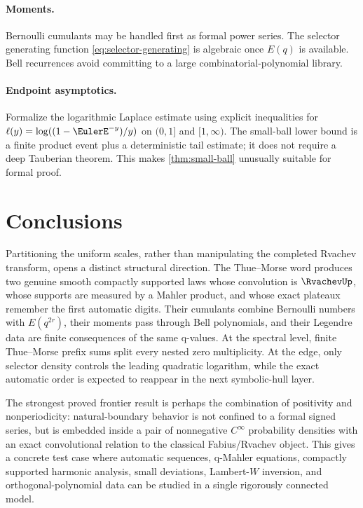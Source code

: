 \documentclass[11pt,oneside]{article}
\numberwithin{equation}{section}
\theoremstyle{definition}
\theoremstyle{remark}
\begin{document}
\paragraph{Moments.}
Bernoulli cumulants may be handled first as formal power series.  The selector generating
function \eqref{eq:selector-generating} is algebraic once $E(q)$ is available.  Bell
recurrences avoid committing to a large combinatorial-polynomial library.

\paragraph{Endpoint asymptotics.}
Formalize the logarithmic Laplace estimate using explicit inequalities for
$\ell(y)=\log((1-\EulerE^{-y})/y)$ on $(0,1]$ and $[1,\infty)$.  The small-ball lower bound is a
finite product event plus a deterministic tail estimate; it does not require a deep
Tauberian theorem.  This makes \cref{thm:small-ball} unusually suitable for formal proof.

\section{Conclusions}

Partitioning the uniform scales, rather than manipulating the completed Rvachev transform,
opens a distinct structural direction.  The Thue--Morse word produces two genuine smooth
compactly supported laws whose convolution is $\RvachevUp$, whose supports are measured by a
Mahler product, and whose exact plateaux remember the first automatic digits.  Their
cumulants combine Bernoulli numbers with $E(q^{2r})$, their moments pass through Bell
polynomials, and their Legendre data are finite consequences of the same q-values.  At the
spectral level, finite Thue--Morse prefix sums split every nested zero multiplicity.  At the
edge, only selector density controls the leading quadratic logarithm, while the exact
automatic order is expected to reappear in the next symbolic-hull layer.

The strongest proved frontier result is perhaps the combination of positivity and
nonperiodicity: natural-boundary behavior is not confined to a formal signed series, but is
embedded inside a pair of nonnegative $C^\infty$ probability densities with an exact
convolutional relation to the classical Fabius/Rvachev object.  This gives a concrete test
case where automatic sequences, q-Mahler equations, compactly supported harmonic analysis,
small deviations, Lambert-$W$ inversion, and orthogonal-polynomial data can be studied in a
single rigorously connected model.
\end{document}

